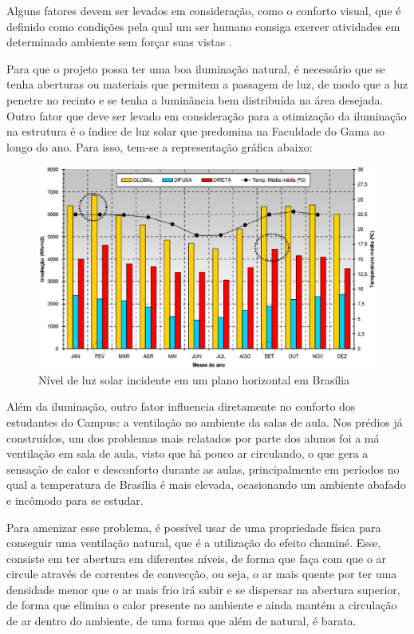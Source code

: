 Alguns fatores devem ser levados em consideração, como o conforto visual, que é definido como condições pela qual um ser humano consiga exercer atividades em determinado ambiente sem forçar suas vistas \cite{garrocho2005}.

Para que o projeto possa ter uma boa iluminação natural, é necessário que se tenha aberturas ou materiais que permitem a passagem de luz, de modo que a luz penetre no recinto e se tenha a luminância bem distribuída na área desejada. Outro fator que deve ser levado em consideração para a otimização da iluminação na estrutura é o índice de luz solar que predomina na Faculdade do Gama ao longo do ano. Para isso, tem-se a representação gráfica abaixo:

 \begin{figure}[!h]
 	\centering
\includegraphics[keepaspectratio=true,scale=0.6]{figuras/luz.eps}
 	\caption{Nível de luz solar incidente em um plano horizontal em Brasília}
 	\label{fig02242}
\end{figure}

Além da iluminação, outro fator influencia diretamente no conforto dos estudantes do Campus:  a ventilação no ambiente da salas de aula. Nos prédios já construídos, um dos problemas mais relatados por parte dos alunos foi a má ventilação em sala de aula, visto que há pouco ar circulando, o que gera a sensação de calor e desconforto durante as aulas, principalmente em períodos no qual a temperatura de Brasília é mais elevada, ocasionando um ambiente abafado e incômodo para se estudar.

Para amenizar esse problema, é possível usar de uma propriedade física para conseguir uma ventilação natural, que é a utilização do efeito chaminé. Esse, consiste em ter abertura em diferentes níveis, de forma que faça com que o ar circule através de correntes de convecção, ou seja, o ar mais quente por ter uma densidade menor que o ar mais frio irá subir e se dispersar na abertura superior, de forma que elimina o calor presente no ambiente e ainda mantém a circulação de ar dentro do ambiente, de uma forma que além de natural, é barata.

